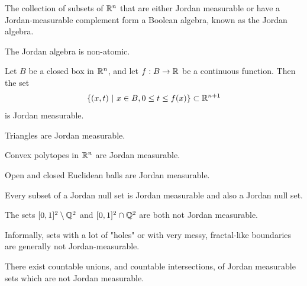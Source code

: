 \begin{theorem}
	The collection of subsets of $\mathbb{R}^n$ that are either Jordan measurable or have a Jordan-measurable complement form a Boolean algebra, known as the Jordan algebra.
\end{theorem}
\begin{theorem}
	The Jordan algebra is non-atomic.
\end{theorem}
\begin{theorem}
	Let $B$ be a closed box in $\mathbb{R}^n$, and let $f : B \to \mathbb{R}$ be a continuous function. Then the set
	\begin{align*}
		\qty{(x,t) ~\middle|~x \in B, 0 \leq t \leq f(x)} \subset \mathbb{R}^{n+1}
	\end{align*}
	is Jordan measurable.
\end{theorem}
\begin{theorem}
	Triangles are Jordan measurable.
\end{theorem}
\begin{theorem}
	Convex polytopes in $\mathbb{R}^n$ are Jordan measurable.
\end{theorem}
\begin{theorem}
	Open and closed Euclidean balls are Jordan measurable.
\end{theorem}
\begin{theorem}
	Every subset of a Jordan null set is Jordan measurable and also a Jordan null set.
\end{theorem}
\begin{theorem}
	The sets $[0,1]^2 \setminus \mathbb{Q}^2$ and $[0,1]^2 \cap \mathbb{Q}^2$ are both not Jordan measurable.
\end{theorem}
Informally, sets with a lot of "holes" or with very messy, fractal-like boundaries are generally not Jordan-measurable.
\begin{theorem}
	There exist countable unions, and countable intersections, of Jordan measurable sets which are not Jordan measurable.
\end{theorem}
\clearpage

